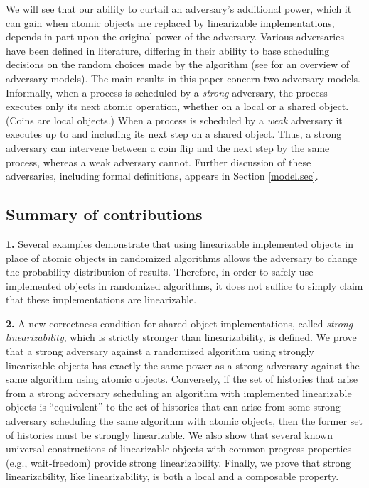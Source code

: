 \documentclass[11pt,letterpaper]{article}
\begin{document}
We will see that our ability to curtail an adversary's additional power, which it can gain
when atomic objects are replaced by linearizable implementations,
depends in part upon the original power of the adversary.
Various adversaries have been defined in literature,
differing in their ability to base scheduling decisions on the random choices made by the algorithm
(see \cite{Aspnes2003_DistrComp} for an overview of adversary models).
The main results in this paper concern two adversary models.
Informally,
when a process is scheduled by a \emph{strong} adversary, the process executes only its next atomic operation,
whether on a local or a shared object.  (Coins are local objects.)
When a process is scheduled by a \emph{weak} adversary
it executes up to and including its next step on a shared object.
Thus, a strong adversary can intervene between a coin flip and the next step by the same process,
whereas a weak adversary cannot.
Further discussion of these adversaries, including formal definitions, appears in Section \ref{model.sec}.

\subsection*{Summary of contributions}

\noindent
\textbf{1.} Several examples demonstrate that using linearizable implemented objects in place of atomic objects in randomized algorithms allows the adversary to change the probability distribution of results.
Therefore, in order to safely use implemented objects in randomized algorithms,
it does not suffice to simply claim that these implementations are linearizable.

\noindent
\textbf{2.} A new correctness condition for shared object implementations, called \emph{strong linearizability},
which is strictly stronger than linearizability, is defined.
      We prove that a strong adversary against a randomized algorithm using strongly linearizable objects
      has exactly the same power as a strong adversary against the same algorithm using atomic objects.
      Conversely, if the set of histories that arise from a strong adversary scheduling an algorithm with implemented
      linearizable objects
      is  ``equivalent'' to the set of histories that can arise from some strong adversary scheduling the same algorithm
      with atomic objects, then the former set of histories must be strongly linearizable.
      We also show that several known universal constructions of linearizable objects with common progress properties
      (e.g., wait-freedom) provide strong linearizability.
      Finally, we prove that strong linearizability, like linearizability, is both a local and a composable property.
\end{document}
